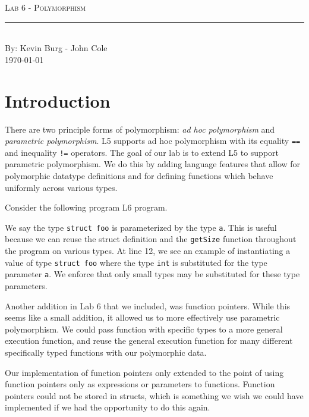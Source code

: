 \documentclass[aps,letterpaper,11pt]{revtex4}
\newcommand{\labtitle}{Lab 6 - Polymorphism}
\newcommand{\authorname}{Kevin Burg - John Cole}
\begin{document}
\begin{titlepage}
\begin{center}
{\Large \textsc{\labtitle} \\ \vspace{4pt}} 
\rule[13pt]{\textwidth}{1pt} \\ \vspace{150pt}
{\large By: \authorname \\ \vspace{10pt}
\today}
\end{center}
\end{titlepage}


\section{Introduction}
There are two principle forms of polymorphism: \emph{ad hoc polymorphism} and \emph{parametric polymorphism}.
L5 supports ad hoc polymorphism with its equality \texttt{==} and inequality \texttt{!=} operators. The goal
of our lab is to extend L5 to support parametric polymorphism. We do this by adding language features that
allow for polymorphic datatype definitions and for defining functions which behave uniformly across various
types.

Consider the following program L6 program.



We say the type \texttt{struct foo} is parameterized by the type \texttt{a}. This is useful because we can 
reuse the struct definition and the \texttt{getSize} function throughout the program on various types.
At line 12, we see an example of instantiating a value of type \texttt{struct foo} where the type
\texttt{int} is substituted for the type parameter \texttt{a}. We enforce that only small types may be
substituted for these type parameters.

Another addition in Lab 6 that we included, was function pointers. While this
seems like a small addition, it allowed us to more effectively use
parametric polymorphism. We could pass function with specific types to a more
general execution function, and reuse the general execution function for
many different specifically typed functions with our polymorphic data.

Our implementation of function pointers only extended to the point of using
function pointers only as expressions or parameters to functions. Function
pointers could not be stored in structs, which is something we wish we could
have implemented if we had the opportunity to do this again.
\end{document}
